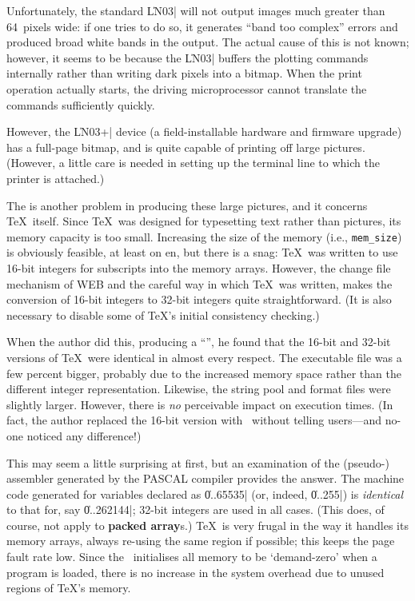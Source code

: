 Unfortunately, the standard \|LN03| will not output images much greater  
than 64~pixels wide: if one tries to do so, it generates ``band too 
complex'' errors and produced broad white bands in the output. The 
actual cause of this is not known; however, it seems to be because the 
\|LN03| buffers the plotting commands internally rather than writing 
dark pixels into a bitmap. When the print operation actually starts, 
the driving microprocessor cannot translate the commands sufficiently 
quickly.

However, the \|LN03+| device (a field-installable hardware and firmware
upgrade) has a full-page bitmap, and is quite capable of printing off 
large pictures. (However, a little care is needed in setting up the 
terminal line to which the printer is attached.)

The is another problem in producing these large pictures, and it 
concerns \TeX\ itself. Since \TeX\ was designed for typesetting text 
rather than pictures, its memory capacity is too small. Increasing the 
size of the memory (i.e., \verb"mem_size") is obviously feasible, at 
least on \VAX en, but there is a snag: \TeX\ was written to use 16-bit 
integers for subscripts into the memory arrays. However, the change file 
mechanism of {\mc WEB} and the careful way in which \TeX\ was written, 
makes the conversion of 16-bit integers to 32-bit integers quite 
straightforward. (It is also necessary to disable some of \TeX's initial
consistency checking.)

When the author did this, producing a ``\bigTeX'', he found that the
16-bit and 32-bit versions of \TeX\ were identical in almost every
respect. The executable file was a few percent bigger, probably due to
the increased memory space rather than the different integer
representation. Likewise, the string pool and format files were slightly
larger. However, there is {\em no\/} perceivable impact on execution
times. (In fact, the author replaced the 16-bit version with \bigTeX\ 
without telling users---and no-one noticed any difference!)

This may seem a little surprising at first, but an examination of the 
(pseudo-) assembler generated by the {\mc PASCAL} compiler provides the 
answer. The machine code generated for variables declared as \|0..65535| 
(or, indeed, \|0..255|) is {\em identical\/} to that for, say 
\|0..262144|; 32-bit integers are used in all cases. (This does, of 
course, not apply to {\bf packed array}s.)
\TeX\ is very frugal in the way it handles its memory arrays, 
always re-using the same region if possible; this keeps the page fault 
rate low. Since the \VAX\ initialises all memory to be `demand-zero' 
when a program is loaded, there is no increase in the system overhead 
due to unused regions of \TeX's memory.

